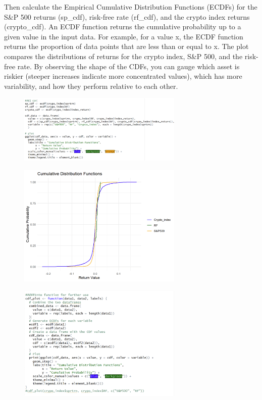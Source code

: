 \documentclass{article}
\begin{document}
Then calculate the Empirical Cumulative Distribution Functions (ECDFs) for the S\&P 500 returns (sp\_cdf), risk-free rate (rf\_cdf), and the crypto index returns (crypto\_cdf). An ECDF function returns the cumulative probability up to a given value in the input data. For example, for a value x, the ECDF function returns the proportion of data points that are less than or equal to x.
The plot compares the distributions of returns for the crypto index, S\&P 500, and the risk-free rate.
By observing the shape of the CDFs, you can gauge which asset is riskier (steeper increases indicate more concentrated values), which has more variability, and how they perform relative to each other.
\begin{figure}[H]
    \centering
    \includegraphics[width=0.7\textwidth]{8.png}
    \label{fig:example}
\end{figure}
\begin{figure}[H]
    \centering
    \includegraphics[width=0.7\textwidth]{9.png}
    \label{fig:example}
\end{figure}
\begin{figure}[H]
    \centering
    \includegraphics[width=0.7\textwidth]{10.png}
    \label{fig:example}
\end{figure}
\end{document}
